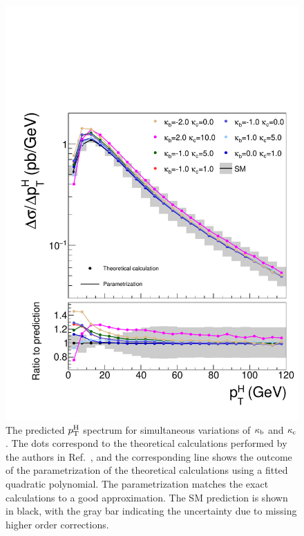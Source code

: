 \begin{figure}[hbtp]
  \begin{center}
    \includegraphics[width=\halflinewidth]{img/interpretation/other/varparcomp_kbkc.pdf}
    \caption{
        The predicted $p_\mathrm{T}^\mathrm{H}$ spectrum for simultaneous variations of $\kappa_{\mathrm{b}}$ and $\kappa_{\mathrm{c}}$.
        The dots correspond to the theoretical calculations performed by the authors in Ref.~\cite{Bishara:2016jga}, and the corresponding line shows the outcome of the parametrization of the theoretical calculations using a fitted quadratic polynomial.
        The parametrization matches the exact calculations to a good approximation.
        The SM prediction is shown in black, with the gray bar indicating the uncertainty due to missing higher order corrections.
        }
    \label{fig:theories_kbkc}
  \end{center}
\end{figure}


